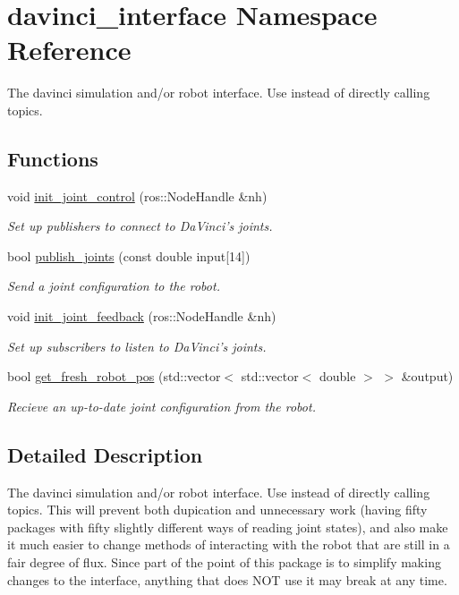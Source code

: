 \hypertarget{namespacedavinci__interface}{\section{davinci\-\_\-interface Namespace Reference}
\label{namespacedavinci__interface}
}


The davinci simulation and/or robot interface. Use instead of directly calling topics.  


\subsection*{Functions}
\begin{DoxyCompactItemize}
\item 
void \hyperlink{namespacedavinci__interface_adc6383d2e91730a320974ecb91d044d1}{init\-\_\-joint\-\_\-control} (ros\-::\-Node\-Handle \&nh)
\begin{DoxyCompactList}\small\item\em Set up publishers to connect to Da\-Vinci's joints. \end{DoxyCompactList}\item 
bool \hyperlink{namespacedavinci__interface_a2e3784f76cf3be72ecbd8decf60fe134}{publish\-\_\-joints} (const double input\mbox{[}14\mbox{]})
\begin{DoxyCompactList}\small\item\em Send a joint configuration to the robot. \end{DoxyCompactList}\item 
void \hyperlink{namespacedavinci__interface_aa2e68a485603086bfe204c4d71be416c}{init\-\_\-joint\-\_\-feedback} (ros\-::\-Node\-Handle \&nh)
\begin{DoxyCompactList}\small\item\em Set up subscribers to listen to Da\-Vinci's joints. \end{DoxyCompactList}\item 
bool \hyperlink{namespacedavinci__interface_a7ade5fe22831b7ea798246d01e29a27e}{get\-\_\-fresh\-\_\-robot\-\_\-pos} (std\-::vector$<$ std\-::vector$<$ double $>$ $>$ \&output)
\begin{DoxyCompactList}\small\item\em Recieve an up-\/to-\/date joint configuration from the robot. \end{DoxyCompactList}\end{DoxyCompactItemize}


\subsection{Detailed Description}
The davinci simulation and/or robot interface. Use instead of directly calling topics. This will prevent both dupication and unnecessary work (having fifty packages with fifty slightly different ways of reading joint states), and also make it much easier to change methods of interacting with the robot that are still in a fair degree of flux. Since part of the point of this package is to simplify making changes to the interface, anything that does N\-O\-T use it may break at any time. 

